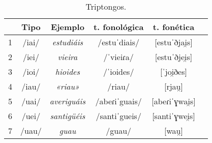 \begin{table}[!ht]
	\centering\small
	\begin{tabular}{rccccc}
		\toprule
		& \textbf{Tipo} & \textbf{Ejemplo} &\textbf{t. fonológica} & \textbf{t. fonética}\\
		\midrule
		1&/iai/  &	\textit{estudiáis}	&	/estuˈdiais/	&	[estuˈðjai̯s]\\
		2&/iei/  &	\textit{vieira}		&       /ˈvieiɾa/	&	[estuˈðjei̯s]\\
		3&/ioi/  &	\textit{hioides}	&       /ˈioides/	&	[ˈjoi̯ðes]\\
		4&/iau/  &	\textit{«riau»}       &       /riau/		&	[rjau̯]\\
		5&/uai/  &	\textit{averiguáis}       &       /abeɾiˈguais/	&	[abeɾiˈɣwai̯s]\\
		6&/uei/  &	\textit{santigüéis}       &       /santiˈgueis/		&	[santiˈɣwei̯s]\\
		7&/uau/  & 	\textit{guau}       &       /guau/		&	[wau̯]\\
		\bottomrule
	\end{tabular}
	\caption{Triptongos.}
	\label{tab:triptongos
	}
\end{table}
